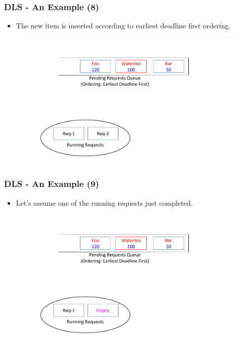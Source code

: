 \documentclass{beamer}
\begin{document}
\begin{frame}
  \frametitle{DLS - An Example (8)}
  \begin{itemize}
  \item The new item is inserted according to earliest deadline first ordering.
    \newline
  \end{itemize}
  \vspace{-5 mm}
  \begin{figure}
    \begin{center}
      \centerline{\includegraphics[scale=0.33]{img/DLS_Example_ZOOM_2.png}}
    \end{center}
  \end{figure}
\end{frame}


\begin{frame}
  \frametitle{DLS - An Example (9)}
  \begin{itemize}
  \item Let's assume one of the running requests just completed.
    \newline
    \newline
  \end{itemize}
  \vspace{-5 mm}
  \begin{figure}
    \begin{center}
      \centerline{\includegraphics[scale=0.33]{img/DLS_Example_ZOOM_3.png}}
    \end{center}
  \end{figure}
\end{frame}
\end{document}
